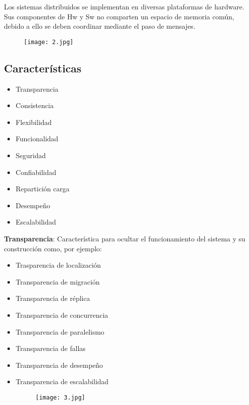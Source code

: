 Los sistemas distribuidos se implementan en diversas plataformas de hardware. Sus componentes de Hw y Sw no comparten un espacio de memoria común, debido a ello se deben coordinar mediante el paso de mensajes.

\begin{figure}[h!]
		\centering
		{\texttt{[image: 2.jpg]}\par} \vspace{1cm}
\end{figure}

{\raggedright
\subsection{Características}
}

\begin{itemize}
	\item Transparencia
	\item Consistencia
	\item Flexibilidad
	\item Funcionalidad
	\item Seguridad
	\item Confiabilidad
	\item Repartición carga
	\item Desempeño
	\item Escalabilidad
\end{itemize}

\textbf{Transparencia}: Característica para ocultar el funcionamiento del sistema y su construcción como, por ejemplo:

\begin{itemize}
	\item Trasparencia de localización
	\item Transparencia de migración
	\item Transparencia de réplica
	\item Transparencia de concurrencia
	\item Transparencia de paralelismo
	\item Transparencia de fallas
	\item Transparencia de desempeño
	\item Transparencia de escalabilidad
	\begin{figure}[h!]
		\centering
		{\texttt{[image: 3.jpg]}\par} \vspace{1cm}
	\end{figure}
\end{itemize}

